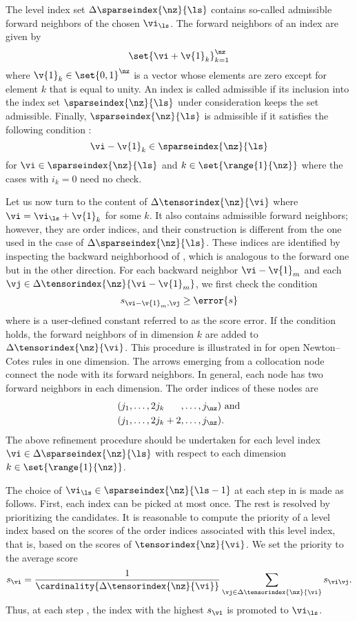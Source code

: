 The level index set $\Delta\sparseindex{\nz}{\ls}$ contains so-called admissible
forward neighbors of the chosen $\vi_{\ls}$. The forward neighbors of an index
\vi are given by
\[
  \set{\vi + \v{1}_k}_{k = 1}^\nz
\]
where $\v{1}_k \in \set{0, 1}^\nz$ is a vector whose elements are zero except
for element $k$ that is equal to unity. An index \vi is called admissible if its
inclusion into the index set $\sparseindex{\nz}{\ls}$ under consideration keeps
the set admissible. Finally, $\sparseindex{\nz}{\ls}$ is admissible if it
satisfies the following condition \cite{klimke2006}:
\[
  \vi - \v{1}_k \in \sparseindex{\nz}{\ls}
\]
for $\vi \in \sparseindex{\nz}{\ls}$ and $k \in \set{\range{1}{\nz}}$ where the
cases with $i_k = 0$ need no check.

Let us now turn to the content of $\Delta\tensorindex{\nz}{\vi}$ where $\vi =
\vi_{\ls} + \v{1}_k$ for some $k$. It also contains admissible forward
neighbors; however, they are order indices, and their construction is different
from the one used in the case of $\Delta\sparseindex{\nz}{\ls}$. These indices
are identified by inspecting the backward neighborhood of \vi, which is
analogous to the forward one but in the other direction. For each backward
neighbor $\vi - \v{1}_m$ and each $\vj \in \Delta\tensorindex{\nz}{\vi -
\v{1}_m}$, we first check the condition
\[
  s_{\vi - \v{1}_m, \vj} \geq \error{s}
\]
where  is a user-defined constant referred to as the score error. If
the condition holds, the forward neighbors of \vj in dimension $k$ are added to
$\Delta\tensorindex{\nz}{\vi}$. This procedure is illustrated in
 for open Newton--Cotes rules in one dimension. The arrows
emerging from a collocation node connect the node with its forward neighbors. In
general, each node has two forward neighbors in each dimension. The order
indices of these nodes are
\begin{align*}
  & (j_1, \dots, 2 j_k \phantom{{} + 2}, \dots, j_{\nz}) \text{ and} \\
  & (j_1, \dots, 2 j_k + 2,              \dots, j_{\nz}).
\end{align*}
The above refinement procedure should be undertaken for each level index $\vi
\in \Delta\sparseindex{\nz}{\ls}$ with respect to each dimension $k \in
\set{\range{1}{\nz}}$.

The choice of $\vi_{\ls} \in \sparseindex{\nz}{\ls - 1}$ at each step \ls in
 is made as follows. First, each index can be picked at
most once. The rest is resolved by prioritizing the candidates. It is reasonable
to compute the priority of a level index \vi based on the scores of the order
indices associated with this level index, that is, based on the scores of
$\tensorindex{\nz}{\vi}$. We set the priority to the average score
\[
  s_{\vi} = \frac{1}{\cardinality{\Delta\tensorindex{\nz}{\vi}}} \sum_{\vj \in \Delta\tensorindex{\nz}{\vi}} s_{\vi \vj}.
\]
Thus, at each step \ls, the index \vi with the highest $s_{\vi}$ is promoted to
$\vi_{\ls}$.

